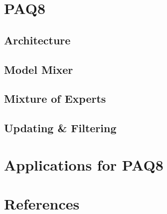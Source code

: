 \documentclass[11pt,usenames,dvipsnames]{beamer}
\begin{document}
\section{PAQ8}
\subsection{Architecture}
\subsection{Model Mixer}
\subsection{Mixture of Experts}
\subsection{Updating \& Filtering}
\section{Applications for PAQ8}
\section{References}
\end{document}
